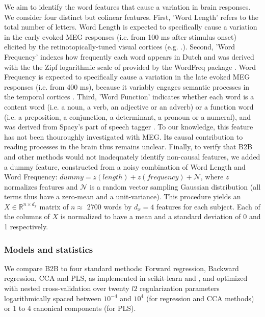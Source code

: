 We aim to identify the word features that cause a variation in brain responses. We consider four distinct but colinear features.
%
First, 'Word Length' refers to the total number of letters. Word Length is expected to specifically cause a variation in the early evoked MEG responses (i.e. from 100 ms after stimulus onset) elicited by the retinotopically-tuned visual cortices (e.g. \citep{pegado2014timing}.).
%
Second, 'Word Frequency' indexes how frequently each word appears in Dutch and was derived with the the Zipf logarithmic scale of \citep{van2014subtlex} provided by the WordFreq package \citep{speerwordfreq}. Word Frequency is expected to specifically cause a variation in the late evoked MEG responses (i.e. from 400 ms), because it variably engages semantic processes in the temporal cortices \citep{kutas2011thirty}.
%
Third, 'Word Function' indicates whether each word is a content word (i.e. a noun, a verb, an adjective or an adverb) or a function word (i.e. a preposition, a conjunction, a determinant, a pronoun or a numeral), and was derived from Spacy's part of speech tagger \citep{spacy2}. To our knowledge, this feature has not been thouroughly investigated with MEG. Its causal contribution to reading processes in the brain thus remains unclear.
%
Finally, to verify that B2B and other methods would not inadequately identify non-causal features, we added a dummy feature, constructed from a noisy combination of Word Length and Word Frequency:
$dummy = z(length) + z(frequency) + \mathcal{N}$, where $z$ normalizes features and $\mathcal{N}$ is a random vector sampling Gaussian distribution (all terms thus have a zero-mean and a unit-variance). This procedure yields an $X \in \mathbb{R}^{n \times d_x}$ matrix of $n\approx$ 2700 words by
$d_x=4$ features for each subject. Each of the columns of $X$ is normalized to
have a mean and a standard deviation of 0 and 1 respectively.

\subsubsection{Models and statistics}

We compare B2B to four standard methods: Forward regression, Backward regression, CCA and PLS, as implemented in scikit-learn \citep{sklearn} and \citep{bilenko2016pyrcca}, and optimized with nested cross-validation over twenty $l2$ regularization parameters logarithmically spaced between $10^{-4}$ and $10^4$ (for regression and CCA methods) or 1 to 4 canonical components (for PLS).

